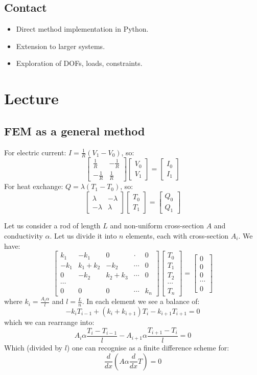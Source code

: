 \documentclass{article}
\newcommand{\mat}[1]{\left[\begin{matrix}#1\end{matrix}\right]}
\newcommand{\vectwo}[2]{\left[\begin{matrix}#1\\#2\end{matrix}\right]}
\newcommand{\mattwo}[4]{\left[\begin{matrix}#1 & #3\\#2 & #4\end{matrix}\right]}
\begin{document}
\subsection*{Contact}

\begin{itemize}
    \item Direct method implementation in Python.
    \item Extension to larger systems.
    \item Exploration of DOFs, loads, constraints.
\end{itemize}



\section{Lecture}
\subsection{FEM as a general method}
For electric current: $I = \frac{1}{R}(V_1-V_0)$, so:
\[\mattwo{\frac{1}{R}}{-\frac{1}{R}}{-\frac{1}{R}}{\frac{1}{R}}\vectwo{V_0}{V_1}=\vectwo{I_0}{I_1}\]
For heat exchange: $Q = \lambda(T_1-T_0)$, so:
\[\mattwo{\lambda}{-\lambda}{-\lambda}{\lambda}\vectwo{T_0}{T_1}=\vectwo{Q_0}{Q_1}\]

Let us consider a rod of length $L$ and non-uniform cross-section $A$ and conductivity $\alpha$. Let us divide it into $n$ elements, each with cross-section $A_i$. We have:
\[\mat{k_1 & -k_1 & 0 & \cdot & 0\\
-k_1 & k_1+k_2 & -k_2 &  \cdots & 0\\
0 & -k_2 & k_2+k_3 & \cdots & 0\\
\cdots\\
0 & 0 & 0 & \cdots & k_n}\mat{T_0\\T_1\\T_2\\\cdots\\T_n} = \mat{0\\0\\0\\\cdots\\0}\]
where $k_i=\frac{A_i\alpha}{l}$ and $l=\frac{L}{n}$. In each element we see a balance of:
\[-k_iT_{i-1}+(k_i+k_{i+1})T_{i}-k_{i+1}T_{i+1} = 0\]
which we can rearrange into:
\[A_i\alpha\frac{T_{i}-T_{i-1}}{l}-A_{i+1}\alpha\frac{T_{i+1}-T_{i}}{l} = 0\]
Which (divided by $l$) one can recognise as a finite difference scheme for:
\[\frac{d}{dx}\left(A\alpha\frac{d}{dx}T\right)=0\]
\end{document}
